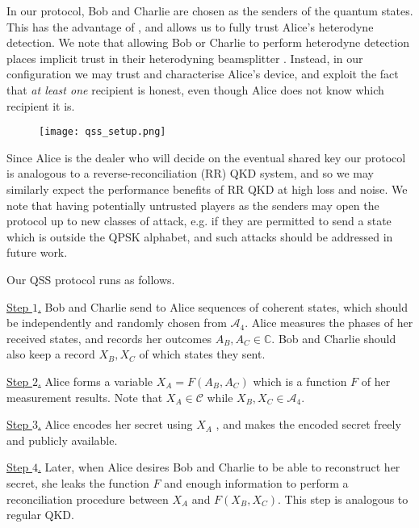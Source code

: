 In our protocol, Bob and Charlie are chosen as the senders of the quantum states. This has the advantage of , and allows us to fully trust Alice's heterodyne detection. We note that allowing Bob or Charlie to perform heterodyne detection places implicit trust in their heterodyning beamsplitter . Instead, in our configuration we may trust and characterise Alice's device, and exploit the fact that \emph{at least one} recipient is honest, even though Alice does not know which recipient it is.

\begin{figure}[htp]
\centering
\texttt{[image: qss\_setup.png]}
\caption{\label{fig:qss_setup}}
\end{figure}

Since Alice is the dealer who will decide on the eventual shared key our protocol is analogous to a reverse-reconciliation (RR) QKD system, and so we may similarly expect the performance benefits of RR QKD at high loss and noise. We note that having potentially untrusted players as the senders may open the protocol up to new classes of attack, e.g. if they are permitted to send a state which is outside the QPSK alphabet, and such attacks should be addressed in future work.


Our QSS protocol runs as follows.


\noindent \underline{Step $1$.} Bob and Charlie send to Alice sequences of coherent states, which should be independently and randomly chosen from $\mathcal{A}_4$. Alice measures the phases of her received states, and records her outcomes $A_B, A_C \in \mathbb{C}$. Bob and Charlie should also keep a record $X_B, X_C$ of which states they sent.

\noindent \underline{Step $2$.} Alice forms a variable $X_A = F\left(A_B, A_C\right)$ which is a function $F$ of her measurement results. Note that $X_A \in \mathcal{C}$ while $X_B, X_C \in \mathcal{A}_4$. 

\noindent \underline{Step $3$.} Alice encodes her secret using $X_A$ , and makes the encoded secret freely and publicly available.

\noindent \underline{Step $4$.} Later, when Alice desires Bob and Charlie to be able to reconstruct her secret, she leaks the function $F$ and enough information to perform a reconciliation procedure between $X_A$ and $F\left(X_B, X_C\right)$. This step is analogous to regular QKD.

